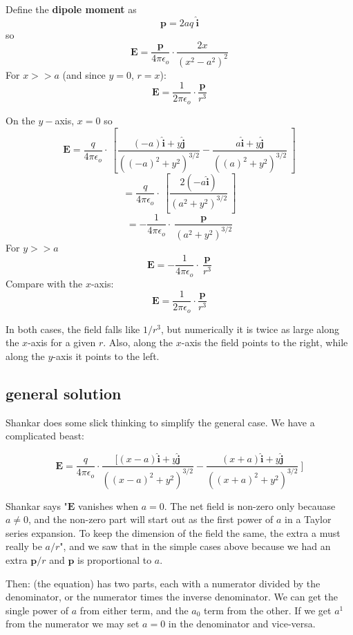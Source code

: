 \documentclass[11pt, oneside]{article}
\begin{document}
Define the \textbf{dipole moment} as
\[ \mathbf{p} = 2aq \ \hat{\mathbf{i}} \]
so
\[ \mathbf{E} = \frac{\mathbf{p}}{4 \pi \epsilon_o} \cdot \frac{2x}{(x^2 - a^2)^2}  \]
For $x >> a$ (and since $y=0$, $r = x$):
\[ \mathbf{E} = \frac{1}{2 \pi \epsilon_o} \cdot \frac{\mathbf{p}}{r^3}  \]

On the $y-$axis, $x = 0$ so 
\[ \mathbf{E} = \frac{q}{4 \pi \epsilon_o} \cdot \ [ \frac{(- a) \hat{\mathbf{i}} + y \hat{\mathbf{j}} }{((- a)^2 + y^2)^{3/2}} - \frac{a \hat{\mathbf{i}} + y \hat{\mathbf{j}} }{((a)^2 + y^2)^{3/2}} \ ] \]
\[ = \frac{q}{4 \pi \epsilon_o} \cdot \ [ \frac{2 (- a \hat{\mathbf{i}}) }{(a^2 + y^2)^{3/2}}  \ ] \]
\[ = - \frac{1}{4 \pi \epsilon_o} \cdot \ \frac{\mathbf{p}}{(a^2 + y^2)^{3/2}}   \]
For $y >> a$
\[ \mathbf{E} = - \frac{1}{4 \pi \epsilon_o} \cdot \ \frac{\mathbf{p}}{r^3}  \]
Compare with the $x$-axis:
\[ \mathbf{E} = \frac{1}{2 \pi \epsilon_o} \cdot \frac{\mathbf{p}}{r^3}  \]

In both cases, the field falls like $1/r^3$, but numerically it is twice as large along the $x$-axis for a given $r$.  Also, along the $x$-axis the field points to the right, while along the $y$-axis it points to the left.

\subsection*{general solution}
Shankar does some slick thinking to simplify the general case.  We have a complicated beast:

\[ \mathbf{E} = \frac{q}{4 \pi \epsilon_o} \cdot \frac{[ (x - a) \hat{\mathbf{i}} + y \hat{\mathbf{j}} }{((x - a)^2 + y^2)^{3/2}} - \frac{(x + a) \hat{\mathbf{i}} + y \hat{\mathbf{j}}}{((x + a)^2 + y^2)^{3/2}} \ ] \]

Shankar says "$\mathbf{E}$ vanishes when $a = 0$.  The net field is non-zero only becauase $a \ne 0$, and the non-zero part will start out as the first power of $a$ in a Taylor series expansion.  To keep the dimension of the field the same, the extra a must really be $a/r$", and we saw that in the simple cases above because we had an extra $\mathbf{p}/r$ and $\mathbf{p}$ is proportional to $a$.

Then:  (the equation) has two parts, each with a numerator divided by the denominator, or the numerator times the inverse denominator. We can get the single power of $a$ from either term, and the $a_0$ term from the other.  If we get $a^1$ from the numerator we may set $a = 0$ in the denominator and vice-versa.
\end{document}
